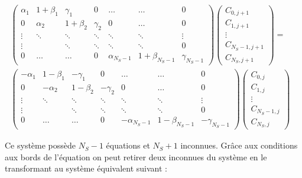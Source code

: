 \documentclass[11pt,a4paper]{article}
\begin{document}
\begin{align*}
\begin{pmatrix}
\alpha_1 & 1 + \beta_1 & \gamma_1 & 0 & \hdots & \hdots & 0 \\ 
0 & \alpha_2 & 1 + \beta_2 & \gamma_2 & 0 & \hdots & 0 \\ 
\vdots & \ddots & \ddots & \ddots & \ddots & \ddots & \vdots \\ 
\vdots &  & \ddots & \ddots & \ddots & \ddots & 0 \\ 
0 & \hdots & \hdots & 0 &  \alpha_{N_S - 1} & 1 + \beta_{N_S -1} & \gamma_{N_S - 1}
\end{pmatrix}
\begin{pmatrix}
C_{0,j+1} \\
C_{1,j+1} \\
\vdots \\
C_{N_S - 1,j+1} \\
C_{N_S, j+1}
\end{pmatrix}
=& \\
\begin{pmatrix}
- \alpha_1 & 1 - \beta_1 & - \gamma_1 & 0 & \hdots & \hdots & 0 \\ 
0 & - \alpha_2 & 1 - \beta_2 & - \gamma_2 & 0 & \hdots & 0 \\ 
\vdots & \ddots & \ddots & \ddots & \ddots & \ddots & \vdots \\ 
\vdots &  & \ddots & \ddots & \ddots & \ddots & 0 \\ 
0 & \hdots & \hdots & 0 & - \alpha_{N_S - 1} & 1 - \beta_{N_S -1} & - \gamma_{N_S - 1}
\end{pmatrix}
\begin{pmatrix}
C_{0,j} \\
C_{1,j} \\
\vdots \\
C_{N_S - 1,j} \\
C_{N_S, j}
\end{pmatrix}
\end{align*}

Ce système possède $N_S - 1$ équations et $N_S + 1$ inconnues. Grâce aux conditions aux bords de l'équation on peut retirer deux inconnues du système en le transformant au système équivalent suivant :
\end{document}
